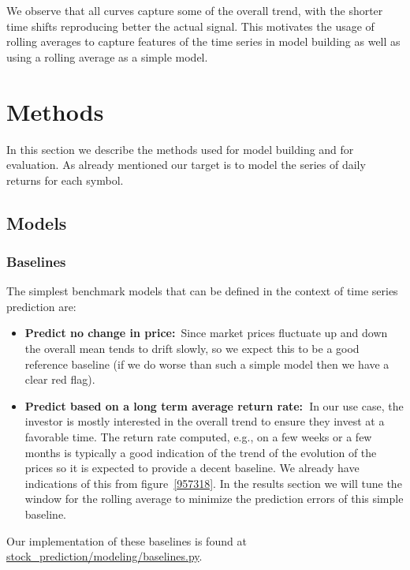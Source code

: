 \documentclass[10pt]{article}
\providecommand{\tightlist}{\setlength{\itemsep}{0pt}\setlength{\parskip}{0pt}}%
\begin{document}
We observe that all curves capture some of the overall trend, with the
shorter time shifts reproducing better the actual signal. This motivates
the usage of rolling averages to capture features of the time series in
model building as well as using a rolling average as a simple model.~~

\section{Methods}

{\label{158856}}

In this section we describe the methods used for model building and for
evaluation. As already mentioned our target is to model the series of
daily returns for each symbol.~

\subsection{Models}

{\label{303985}}

\subsubsection{Baselines}

{\label{344790}}

The simplest benchmark models that can be defined in the context of time
series prediction are:

\begin{itemize}
\tightlist
\item
  \textbf{Predict no change in price:}~Since market prices fluctuate up
  and down the overall mean tends to drift slowly, so we expect this to
  be a good reference baseline (if we do worse than such a simple model
  then we have a clear red flag).
\item
  \textbf{Predict based on a long term average return rate:~}In our use
  case, the investor is mostly interested in the overall trend to ensure
  they invest at a favorable time. The return rate computed, e.g., on a
  few weeks or a few months is typically a good indication of the trend
  of the evolution of the prices so it is expected to provide a decent
  baseline. We already have indications of this from
  figure~{\ref{957318}}. In the results section we will
  tune the window for the rolling average to minimize the prediction
  errors of this simple baseline.
\end{itemize}

Our implementation of these baselines is found at
\href{https://github.com/marcoopsampaio/aws_ml_eng_project_stock_prediction/blob/main/stock_prediction/modeling/baselines.py}{stock\_prediction/modeling/baselines.py}.
\end{document}
